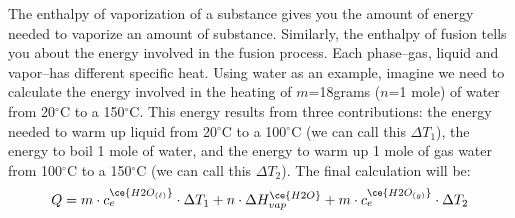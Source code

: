 \documentclass[main.tex]{subfiles}
\newcommand\chapterlabel{solids}
\begin{document}
\begin{description}
\begin{center}
\end{center}



\item[\docfilehook{Energy calculations involving phase transitions}{}] 
The enthalpy of vaporization of a substance gives you the amount of energy needed to vaporize an amount of substance. Similarly, the enthalpy of fusion tells you about the energy involved in the fusion process. Each phase--gas, liquid and vapor--has different specific heat. Using water as an example, imagine we need to calculate the energy involved in the heating of $m$=18grams ($n$=1 mole) of water from 20$^{\circ}$C to a 150$^{\circ}$C. This energy results from three contributions: the energy needed to warm up liquid from 20$^{\circ}$C to a 100$^{\circ}$C (we can call this $\Delta T_1$), the energy to boil 1 mole of water, and the energy to warm up 1 mole of gas water from 100$^{\circ}$C to a 150$^{\circ}$C (we can call this $\Delta T_2$). The final calculation will be:
\begin{equation*}
Q=m\cdot c_e^{\ce{H2O_{(\ell)}}}\cdot \Delta T_1 + n\cdot \Delta H_{vap}^{\ce{H2O}} + m\cdot c_e^{\ce{H2O_{(g)}}}\cdot \Delta T_2
\end{equation*}




\end{description}
\end{document}

